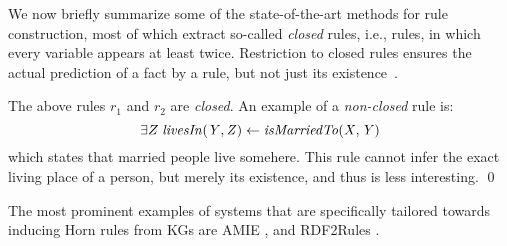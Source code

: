 We now briefly summarize some of the state-of-the-art methods %
for rule construction, most of which %
extract so-called \emph{closed} rules,
i.e., rules, in which every variable appears at least twice. Restriction to closed rules %
ensures the actual prediction  of a fact by a rule, but not just its existence~\cite{amie}.

\begin{example}
The above rules $r_1$ and $r_2$ are \textit{closed}. %
An example of a \emph{non-closed} rule is:
\[\exists Z\; \mathit{livesIn(Y,Z)} \leftarrow \mathit{isMarriedTo(X,Y)} \]  which states that married people 
live somehere. This rule cannot infer the exact living place of a person, but merely its existence, and thus is less interesting. \qed%
\end{example}

The most prominent examples of systems that are specifically tailored towards inducing Horn rules from KGs are AMIE \cite{amie}, %
and RDF2Rules \cite{rdf2rules}.
